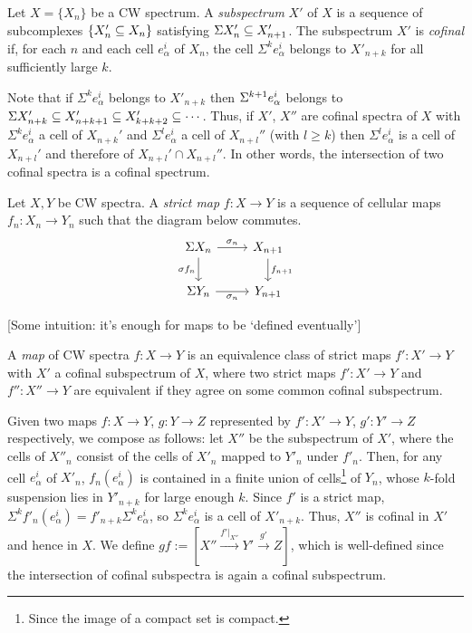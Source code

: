 \documentclass{MetricNotes2023}
\def\subq{\ensuremath\subseteq}
\def\SIgma{\ensuremath\Sigma}
\begin{document}
\begin{definition}
Let \(X=\{X_n\}\) be a CW spectrum. A \textit{subspectrum} \(X'\) of \(X\) is a sequence of subcomplexes \(\{X_n'\subq X_n\}\) satisfying \(\Sigma X_n'\subq X_{n+1}'\). The subspectrum \(X'\) is \textit{cofinal} if, for each \(n\) and each cell \(e^i_\alpha\) of \(X_n\), the cell \(\Sigma^k e_\alpha^i\) belongs to \(X'_{n+k}\) for all sufficiently large \(k\).
\end{definition}

Note that if \(\Sigma^ke^i_\alpha\) belongs to \(X'_{n+k}\) then \(\SIgma^{k+1}e^i_\alpha\) belongs to \(\Sigma X'_{n+k}\subq X'_{n+k+1}\subq X'_{k+k+2}\subq \cdots\). Thus, if \(X'\), \(X''\) are cofinal spectra of \(X\) with \(\Sigma^k e_{\alpha}^i\) a cell of \(X_{n+k}'\) and \(\Sigma^l e_\alpha^i\) a cell of \(X_{n+l}''\) (with \(l\geq k\)) then \(\Sigma^l e_\alpha^i\) is a cell of \(X_{n+l}'\) and therefore of \(X_{n+l}'\cap X_{n+l}''\). In other words, the intersection of two cofinal spectra is a cofinal spectrum.

\begin{definition}
Let \(X, Y\) be CW spectra. A \textit{strict map} \(f : X \to Y\) is a sequence of cellular maps \(f_n : X_n \to Y_n\) such that the diagram below commutes.
\[\begin{tikzcd}
\Sigma X_n \arrow[r, "\sigma_n"] \arrow[d, swap, "\sigma f_n"]  & X_{n+1} \arrow[d, "f_{n+1}"]  \\
\SIgma Y_n \arrow[r, swap, "\sigma_n"]  & Y_{n+1}
\end{tikzcd}\]
\end{definition}

[Some intuition: it's enough for maps to be `defined eventually']

\begin{definition}
A \textit{map} of CW spectra \(f : X \to Y\) is an equivalence class of strict maps \(f' : X' \to Y\) with \(X'\) a cofinal subspectrum of \(X\), where two strict maps \(f' : X' \to Y\) and \(f'' : X'' \to Y\) are equivalent if they agree on some common cofinal subspectrum. 
\end{definition}

Given two maps \(f : X \to Y\), \(g : Y \to Z\) represented by \(f' : X' \to Y\), \(g' : Y' \to Z\) respectively, we compose as follows: let \(X''\) be the subspectrum of \(X'\), where the cells of \(X''_n\) consist of the cells of \(X'_n\) mapped to \(Y'_n\) under \(f'_n\). Then, for any cell \(e^i_\alpha\) of \(X'_n\), \(f_n(e^i_\alpha)\) is contained in a finite union of cells\footnote{Since the image of a compact set is compact.} of \(Y_n\), whose \(k\)-fold suspension lies in \(Y'_{n+k}\) for large enough \(k\). Since \(f'\) is a strict map, \(\Sigma^kf'_n(e^i_\alpha)=f'_{n+k}\Sigma^ke^i_\alpha\), so \(\Sigma^ke^i_\alpha\) is a cell of \(X'_{n+k}\). Thus, \(X''\) is cofinal in \(X'\) and hence in \(X\). We define \(gf := [X'' \xrightarrow{f'|_{X''}}Y' \xrightarrow{g'}Z]\), which is well-defined since the intersection of cofinal subspectra is again a cofinal subspectrum. 
\end{document}
